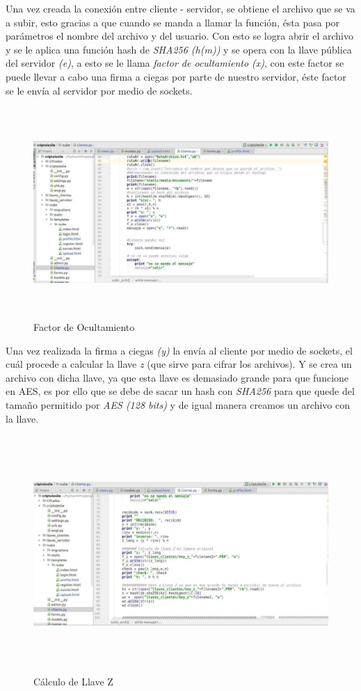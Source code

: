 Una vez creada la conexión  entre cliente - servidor, se obtiene el archivo que se va a subir, esto gracias a que cuando se manda a llamar la función, ésta pasa por parámetros el nombre del archivo y del usuario. Con esto se logra abrir el archivo y se le aplica una función hash de \textit{SHA256 (h(m))} y se opera con la llave pública del servidor \textit{(e)}, a esto se le llama \textit{factor de ocultamiento (x)}, con este factor se puede llevar a cabo una firma a ciegas por parte de nuestro servidor, éste factor se le envía al servidor por medio de  sockets.

			\begin{figure}[H]
			\centering
			\includegraphics[width=17cm, height=8cm]{./images/Interfaz/09.jpg}
			\caption{Factor de Ocultamiento}
			\label{fig:6-4-9} 
			\end{figure}

Una vez realizada la firma a ciegas \textit{(y)} la envía al cliente por medio de sockets, el cuál procede a calcular la llave \textit{z} (que sirve para cifrar los archivos). Y se crea un archivo con dicha llave, ya que esta llave es demasiado grande para que funcione en AES, es por ello que se debe de sacar un hash con \textit{SHA256} para que quede del tamaño permitido por \textit{AES (128 bits)} y de igual manera creamos un archivo con la llave.

			\begin{figure}[H]
			\centering
			\includegraphics[width=17cm, height=9cm]{./images/Interfaz/10.jpg}
			\caption{Cálculo de Llave Z}
			\label{fig:6-4-10} 
			\end{figure}

